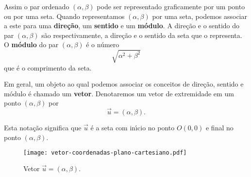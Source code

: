 Assim o par ordenado $(\alpha, \beta)$ pode ser representado graficamente por um ponto ou por uma seta. Quando representamos $(\alpha, \beta)$ por uma seta, podemos associar a este para uma \textbf{dire\c{c}\~ao}, um \textbf{sentido} e um \textbf{m\'odulo}. A dire\c{c}\~ao e o sentido do par $(\alpha, \beta)$ s\~ao respectivamente, a dire\c{c}\~ao e o sentido da seta que o representa. O \textbf{m\'odulo} do par $(\alpha, \beta)$ \'e o n\'umero
\[
	\sqrt{\alpha^2 + \beta^2}
\] 
que \'e o comprimento da seta.

Em geral, um objeto ao qual podemos associar os conceitos de dire\c{c}\~ao, sentido e m\'odulo \'e chamado um \textbf{vetor}. Denotaremos um vetor de extremidade em um ponto $(\alpha, \beta)$ por
\[
	\vec{u} = (\alpha, \beta).
\]

Esta nota\c{c}\~ao significa que $\vec{u}$ \'e a seta com in{\'\i}cio no ponto $O(0,0)$ e final no ponto $(\alpha, \beta)$.
\begin{figure}[!h]
	\centering
	\caption{Vetor $ \vec{u} = (\alpha, \beta)$.}
	\texttt{[image: vetor-coordenadas-plano-cartesiano.pdf]}


\end{figure}



